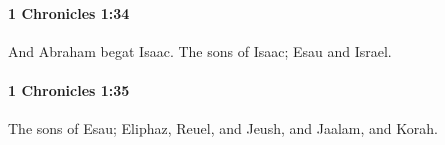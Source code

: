 		\paragraph{1 Chronicles 1:34} %
			\label{1CHRONICLES-1-34}

			And Abraham begat Isaac. The sons of Isaac; Esau and Israel.


		\paragraph{1 Chronicles 1:35} %
			\label{1CHRONICLES-1-35}

			The sons of Esau; Eliphaz, Reuel, and Jeush, and Jaalam, and Korah.


